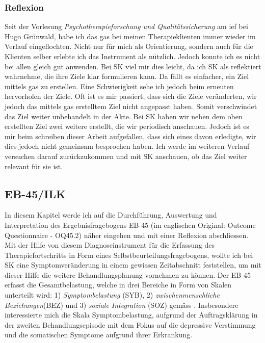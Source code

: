 \subsubsection{Reflexion}
Seit der Vorlesung \textit{Psychotherapieforschung und Qualitätssicherung} am \ac{ief} bei Hugo Grünwald, habe ich das \ac{gas} bei meinen Therapieklienten immer wieder im Verlauf eingeflochten. Nicht nur für mich als Orientierung, sondern auch für die Klienten selber erlebte ich das Instrument als nützlich. Jedoch konnte ich es nicht bei allen gleich gut anwenden. Bei SK viel mir dies leicht, da ich SK als reflektiert wahrnehme, die ihre Ziele klar formulieren kann. Da fällt es einfacher, ein Ziel mittels \ac{gas} zu erstellen. Eine Schwierigkeit sehe ich jedoch beim erneuten hervorholen der Ziele. Oft ist es mir passiert, dass sich die Ziele veränderten, wir jedoch das mittels \ac{gas} erstelltem Ziel nicht angepasst haben. Somit verschwindet das Ziel weiter unbehandelt in der Akte. Bei SK haben wir neben dem oben erstellten Ziel zwei weitere erstellt, die wir periodisch anschauen. Jedoch ist es mir beim schreiben dieser Arbeit aufgefallen, dass sich eines davon erledigte, wir dies jedoch nicht gemeinsam besprochen haben. Ich werde im weiteren Verlauf versuchen darauf zurückzukommen und mit SK anschauen, ob das Ziel weiter relevant für sie ist.

\subsection{EB-45/ILK}
In diesem Kapitel werde ich auf die Durchführung, Auswertung und Interpretation des Ergebnisfragebogens EB-45 (im englischen Original: Outcome Questionnaire - OQ45.2) näher eingehen \cite{Lambert2002} und mit einer Reflexion abschliessen. Mit der Hilfe von diesem Diagnoseinstrument für die Erfassung des Therapiefortschritts in Form eines Selbstbeurteilungsfragebogens, wollte ich bei SK eine Symptomveränderung in einem gewissen Zeitabschnitt feststellen, um mit dieser Hilfe die weitere Behandlungsplanung vornehmen zu können. Der EB-45 erfasst die Gesamtbelastung, welche in drei Bereiche in Form von Skalen unterteilt wird: 1) \textit{Symptombelastung} (SYB), 2) \textit{zwischenmenschliche Beziehungen}(BEZ) und 3) \textit{soziale Integration} (SOZ) gemäss . Insbesondere interessierte mich die Skala Symptombelastung, aufgrund der Auftragsklärung in der zweiten Behandlungsepisode mit dem Fokus auf die depressive Verstimmung und die somatischen Symptome aufgrund ihrer Erkrankung. 


